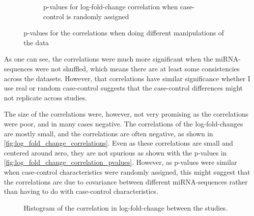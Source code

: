 \begin{figure}
\begin{subfigure}[b]{0.5\textwidth}
{
        }
        \caption{p-values for log-fold-change correlation when case-control is randomly assigned}
        \label{fig:fold_correlation_pvalues_case_shuffled}
    \end{subfigure}
    \caption{p-values for the correlations when doing different manipulations of the data}
    \label{fig:log_fold_change_correlation_pvalues}
\end{figure}

As one can see, the correlations were much more significant when the miRNA-sequences were not shuffled, which means there are at least some consistencies across the datasets. However, that correlations have similar significance whether I use real or random case-control suggests that the case-control differences might not replicate across studies.

The size of the correlations were, however, not very promising as the correlations were poor, and in many cases negative. The correlations of the log-fold-changes are mostly small, and the correlations are often negative, as shown in \autoref{fig:log_fold_change_correlations}. Even as these correlations are small and centered around zero, they are not spurious as shown with the p-values in \autoref{fig:log_fold_change_correlation_pvalues}. However, as p-values were similar when case-control characteristics were randomly assigned, this might suggest that the correlations are due to covariance between different miRNA-sequences rather than having to do with case-control characteristics.

\begin{figure}
    \centering
    \caption{Histogram of the correlation in log-fold-change between the studies.}
    \label{fig:log_fold_change_correlations}
\end{figure}

